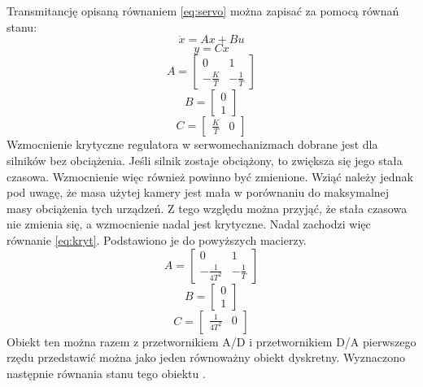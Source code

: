 Transmitancję opisaną równaniem \ref{eq:servo} można zapisać za pomocą równań stanu:
\begin{equation}
\dot{x}=Ax+Bu
\end{equation}
\begin{equation}
y=Cx
\end{equation}
\begin{equation}
A=
	\begin{bmatrix}
	0 & 1 \\
	-\frac{K}{T} & -\frac{1}{T}
	\end{bmatrix}
\end{equation}
\begin{equation}
B=
	\begin{bmatrix}
	0 \\
	1
	\end{bmatrix}
\end{equation}
\begin{equation}
C=
	\begin{bmatrix}
	\frac{K}{T} & 0
	\end{bmatrix}
\end{equation}
Wzmocnienie krytyczne regulatora w serwomechanizmach dobrane jest dla silników bez obciążenia. Jeśli silnik zostaje obciążony, to zwiększa się jego stała czasowa. Wzmocnienie więc również powinno być zmienione. Wziąć należy jednak pod uwagę, że masa użytej kamery jest mała w porównaniu do maksymalnej masy obciążenia tych urządzeń. Z tego względu można przyjąć, że stała czasowa nie zmienia się, a wzmocnienie nadal jest krytyczne. Nadal zachodzi więc równanie \ref{eq:kryt}. Podstawiono je do powyższych macierzy.
\begin{equation}
A=
	\begin{bmatrix}
	0 & 1 \\
	-\frac{1}{4T^2} & -\frac{1}{T}
	\end{bmatrix}
\end{equation}
\begin{equation}
B=
	\begin{bmatrix}
	0 \\
	1
	\end{bmatrix}
\end{equation}
\begin{equation}
C=
	\begin{bmatrix}
	\frac{1}{4T^2} & 0
	\end{bmatrix}
\end{equation}
Obiekt ten można razem z przetwornikiem A/D i przetwornikiem D/A pierwszego rzędu przedstawić można jako jeden równoważny obiekt dyskretny. Wyznaczono następnie równania stanu tego obiektu \cite{TS}.
